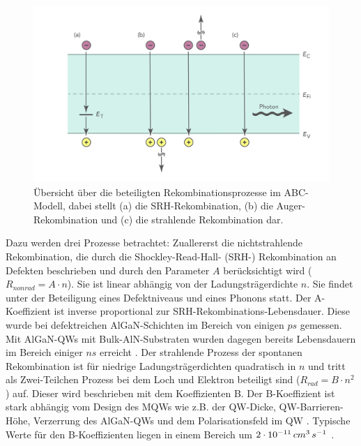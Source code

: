 %
\begin{figure}[h]
    \centering
    \begin{minipage}[t]{0.75\linewidth}
        \centering
        \includegraphics[width=\linewidth]{Bilder/rekbomChannels.png}
        \caption{Übersicht über die beteiligten Rekombinationsprozesse im ABC-Modell, dabei stellt (a) die SRH-Rekombination, (b) die Auger-Rekombination und (c) die strahlende Rekombination dar.}
        \label{fig:rekombChannels}
    \end{minipage}%
\end{figure}
\noindent
%
Dazu werden drei Prozesse betrachtet: Zuallererst die nichtstrahlende Rekombination, die durch die Shockley-Read-Hall- (SRH-) Rekombination an Defekten beschrieben und durch den Parameter $A$ berücksichtigt wird ($R_{nonrad} = A \cdot n $). Sie ist linear abhängig von der Ladungsträgerdichte $n$. Sie findet unter der Beteiligung eines Defektniveaus und eines Phonons statt. Der A-Koeffizient ist inverse proportional zur SRH-Rekombinations-Lebensdauer. Diese wurde bei defektreichen AlGaN-Schichten im Bereich von einigen $ps$ gemessen. Mit AlGaN-QWs mit Bulk-AlN-Substraten wurden dagegen bereits Lebensdauern im Bereich einiger $ns$ erreicht \cite{1882-0786-4-9-092101} \cite{doi:10.1002/pssc.201100424}. Der strahlende Prozess der spontanen Rekombination ist für niedrige Ladungsträgerdichten quadratisch in $n$ und tritt als Zwei-Teilchen Prozess bei dem Loch und Elektron beteiligt sind ($R_{rad} = B \cdot n^2 $) auf. Dieser wird beschrieben mit dem Koeffizienten B. Der B-Koeffizient ist stark abhängig vom Design des MQWs wie z.B. der QW-Dicke, QW-Barrieren-Höhe, Verzerrung des AlGaN-QWs und dem Polarisationsfeld im QW \cite{kneissl}. Typische Werte für den B-Koeffizienten liegen in einem Bereich um $2 \cdot 10^{-11} \thinspace cm^3 \thinspace s^{-1}$ \cite{1882-0786-8-2-022104} \cite{1882-0786-4-5-052101}.  
